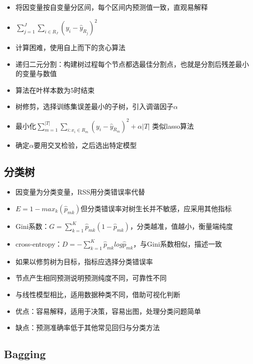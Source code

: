 \documentclass[
]{book}
\providecommand{\tightlist}{%
  \setlength{\itemsep}{0pt}\setlength{\parskip}{0pt}}
\begin{document}
\begin{itemize}
\tightlist
\item
  将因变量按自变量分区间，每个区间内预测值一致，直观易解释
\item
  \(\sum_{j = 1}^J\sum_{i \in R_J}(y_i - \hat y_{R_j})^2\)
\item
  计算困难，使用自上而下的贪心算法
\item
  递归二元分割：构建树过程每个节点都选最佳分割点，也就是分割后残差最小的变量与数值
\item
  算法在叶样本数为5时结束
\item
  树修剪，选择训练集误差最小的子树，引入调谐因子\(\alpha\)
\item
  最小化\(\sum_{m = 1}^{|T|} \sum_{i:x_i \in R_m} (y_i - \hat y_{R_m})^2 + \alpha|T|\) 类似lasso算法
\item
  确定\(\alpha\)要用交叉检验，之后选出特定模型
\end{itemize}

\hypertarget{ux5206ux7c7bux6811}{%
\subsection{分类树}\label{ux5206ux7c7bux6811}}

\begin{itemize}
\tightlist
\item
  因变量为分类变量，RSS用分类错误率代替
\item
  \(E = 1 - max_k(\hat p_{mk})\)但分类错误率对树生长并不敏感，应采用其他指标
\item
  Gini系数：\(G = \sum_{k = 1}^K\hat p_{mk}(1 - \hat p_{mk})\)，分类越准，值越小，衡量端纯度
\item
  cross-entropy：\(D = - \sum_{k = 1}^K\hat p_{mk} log\hat p_{mk}\)，与Gini系数相似，描述一致
\item
  如果以修剪树为目标，指标应选择分类错误率
\item
  节点产生相同预测说明预测纯度不同，可靠性不同
\item
  与线性模型相比，适用数据种类不同，借助可视化判断
\item
  优点：容易解释，适用于决策，容易出图，处理分类问题简单
\item
  缺点：预测准确率低于其他常见回归与分类方法
\end{itemize}

\hypertarget{bagging}{%
\subsection{Bagging}\label{bagging}}
\end{document}
